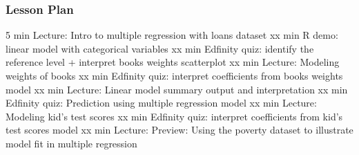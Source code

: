 \begin{frame}
    \frametitle{Lesson Plan}
    \begin{itemize}
        5 min Lecture: Intro to multiple regression with loans dataset
        xx min R demo: linear model with categorical variables
        xx min Edfinity quiz: identify the reference level + interpret books weights scatterplot
        xx min Lecture: Modeling weights of books
        xx min Edfinity quiz: interpret coefficients from books weights model
        xx min Lecture: Linear model summary output and interpretation
        xx min Edfinity quiz: Prediction using multiple regression model
        xx min Lecture: Modeling kid's test scores
        xx min Edfinity quiz: interpret coefficients from kid's test scores model
        xx min Lecture: Preview: Using the poverty dataset to illustrate model fit in multiple regression




        
    \end{itemize}
\end{frame}

% 